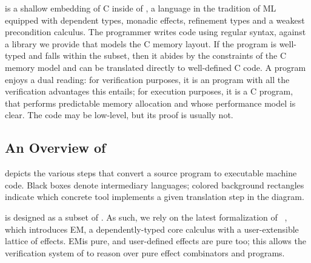 \lowstar is a shallow embedding of C inside of \fstar, a language in
the tradition of ML equipped with dependent types, monadic effects,
refinement types and a weakest precondition calculus. The programmer writes
\lowstar code using regular \fstar syntax, against a library we provide that
models the C memory layout. If the program is well-typed and falls within the
\lowstar subset, then it abides by the constraints of the C memory model and can
be translated directly to well-defined C code.
A \lowstar program enjoys a dual reading: for verification purposes,
it is an \fstar program with all the verification advantages this
entails; for execution purposes, it is a C program, that
performs predictable memory allocation and whose performance model is
clear. The \lowstar code may be low-level, but its proof is usually not.

\subsection{An Overview of \lowstar}


 depicts the various steps that convert a \lowstar
source program to executable machine code.
%
Black boxes denote intermediary languages;
colored background rectangles indicate which concrete tool implements a given
translation step in the diagram.

\lowstar is designed as a subset of \fstar. As such, we rely on the latest
formalization of \fstar~\cite{dm4free}, which introduces EM\fstar, a
dependently-typed core calculus with a user-extensible lattice of effects.
EM\fstar is pure, and user-defined effects are pure too; this allows the
verification system of \fstar to reason over pure effect combinators and
programs.

